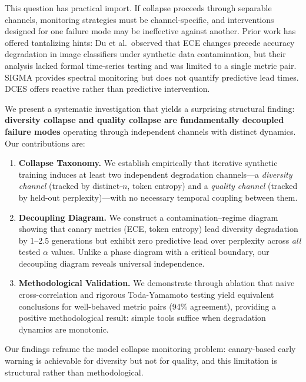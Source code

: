 \documentclass[letterpaper,11pt]{article}
\begin{document}
This question has practical import.
If collapse proceeds through separable channels, monitoring strategies must be channel-specific, and interventions designed for one failure mode may be ineffective against another.
Prior work has offered tantalizing hints: Du et al.\ observed that ECE changes precede accuracy degradation in image classifiers under synthetic data contamination, but their analysis lacked formal time-series testing and was limited to a single metric pair.
SIGMA \cite{vela2022sigma} provides spectral monitoring but does not quantify predictive lead times.
DCES \cite{alemohammad2024selfconsuming} offers reactive rather than predictive intervention.

We present a systematic investigation that yields a surprising structural finding: \textbf{diversity collapse and quality collapse are fundamentally decoupled failure modes} operating through independent channels with distinct dynamics.
Our contributions are:

\begin{enumerate}
    \item \textbf{Collapse Taxonomy.} We establish empirically that iterative synthetic training induces at least two independent degradation channels---a \emph{diversity channel} (tracked by distinct-$n$, token entropy) and a \emph{quality channel} (tracked by held-out perplexity)---with no necessary temporal coupling between them.

    \item \textbf{Decoupling Diagram.} We construct a contamination--regime diagram showing that canary metrics (ECE, token entropy) lead diversity degradation by 1--2.5 generations but exhibit zero predictive lead over perplexity across \emph{all} tested $\alpha$ values. Unlike a phase diagram with a critical boundary, our decoupling diagram reveals universal independence.

    \item \textbf{Methodological Validation.} We demonstrate through ablation that naive cross-correlation and rigorous Toda-Yamamoto testing yield equivalent conclusions for well-behaved metric pairs (94\% agreement), providing a positive methodological result: simple tools suffice when degradation dynamics are monotonic.
\end{enumerate}

Our findings reframe the model collapse monitoring problem: canary-based early warning is achievable for diversity but not for quality, and this limitation is structural rather than methodological.
\end{document}
